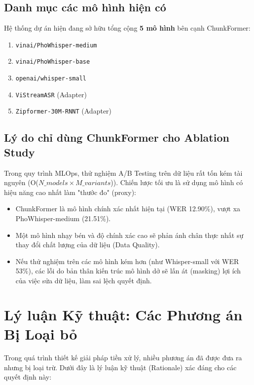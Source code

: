 \documentclass[12pt,a4paper]{article}
\begin{document}
\subsection{Danh mục các mô hình hiện có}
Hệ thống dự án hiện đang sở hữu tổng cộng \textbf{5 mô hình} bên cạnh ChunkFormer:
\begin{enumerate}[leftmargin=1.2cm]
    \item \texttt{vinai/PhoWhisper-medium}
    \item \texttt{vinai/PhoWhisper-base}
    \item \texttt{openai/whisper-small}
    \item \texttt{ViStreamASR} (Adapter)
    \item \texttt{Zipformer-30M-RNNT} (Adapter)
\end{enumerate}

\subsection{Lý do chỉ dùng ChunkFormer cho Ablation Study}
Trong quy trình MLOps, thử nghiệm A/B Testing trên dữ liệu rất tốn kém tài nguyên (O($N\_models \times M\_variants$)). Chiến lược tối ưu là sử dụng mô hình có hiệu năng cao nhất làm "thước đo" (proxy):
\begin{itemize}[leftmargin=1.2cm]
    \item ChunkFormer là mô hình chính xác nhất hiện tại (WER 12.90\%), vượt xa PhoWhisper-medium (21.51\%).
    \item Một mô hình nhạy bén và độ chính xác cao sẽ phản ánh chân thực nhất sự thay đổi chất lượng của dữ liệu (Data Quality).
    \item Nếu thử nghiệm trên các mô hình kém hơn (như Whisper-small với WER 53\%), các lỗi do bản thân kiến trúc mô hình dở sẽ lấn át (masking) lợi ích của việc sửa dữ liệu, làm sai lệch quyết định.
\end{itemize}

\section{Lý luận Kỹ thuật: Các Phương án Bị Loại bỏ}

Trong quá trình thiết kế giải pháp tiền xử lý, nhiều phương án đã được đưa ra nhưng bị loại trừ. Dưới đây là lý luận kỹ thuật (Rationale) xác đáng cho các quyết định này:
\end{document}
